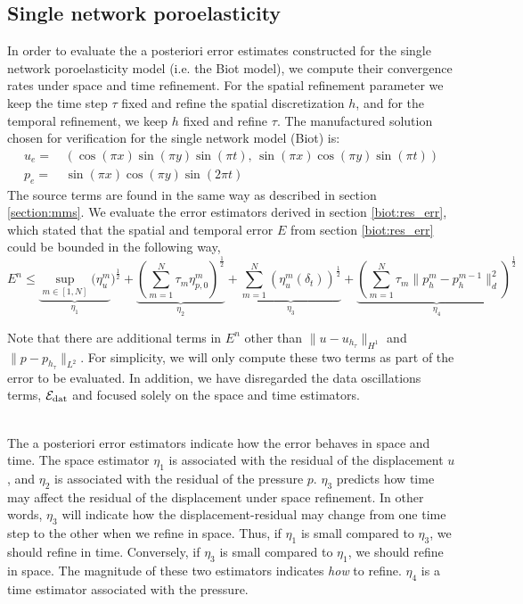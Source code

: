 \subsection{Single network poroelasticity} \label{section:num_exp_mpet1}
In order to evaluate the a posteriori error estimates constructed for the single network poroelasticity model (i.e. the Biot model), we compute their convergence rates under space and time refinement. For the spatial refinement parameter we keep the time step $\tau$ fixed and refine the spatial discretization $h$, and for the temporal refinement, we keep $h$ fixed and refine $\tau$. The manufactured solution chosen for verification for the single network model (Biot) is:
\begin{align*}
u_e = & \, \left(\cos(\pi x)\sin(\pi y)\sin(\pi t), \, \sin(\pi x)\cos(\pi y)\sin(\pi t)\right) \\
p_e = & \, \sin(\pi x) \cos(\pi y)\sin(2\pi t)
\end{align*}
The source terms are found in the same way as described in section \ref{section:mms}. We evaluate the error estimators derived in section \ref{biot:res_err}, which stated that the spatial and temporal error $E$ from section \ref{biot:res_err} could be bounded in the following way,
\begin{equation} \label{biot:error_upbd}
E^n \leq \underbrace{\sup_{m \in [1,N]} (\eta^m_u}_{\eta_1})^\frac{1}{2}  +  \underbrace{(\sum_{m=1}^N \tau_m \eta^m_{p,0})^\frac{1}{2}}_{\eta_2} + \underbrace{\sum_{m=1}^N (\eta^m_u(\delta_t))^\frac{1}{2}}_{\eta_3} + \underbrace{(\sum_{m=1}^N \tau_m \| p_h^m - p_h^{m-1}\|^2_d)^\frac{1}{2}}_{\eta_4}
\end{equation}
\begin{remark}
Note that there are additional terms in $E^n$ other than $\|u - u_{h_{\tau}}\|_{H^1}$ and $\|p - p_{h_{\tau}}\|_{L^2}$. For simplicity, we will only compute these two terms as part of the error to be evaluated. In addition, we have disregarded the data oscillations terms, $\mathcal{E}_{\textnormal{dat}}$ and focused solely on the space and time estimators.
\end{remark}
\mbox{}\\
The a posteriori error estimators indicate how the error behaves in space and time. The space estimator $\eta_1$ is associated with the residual of the displacement $u$, and $\eta_2$ is associated with the residual of the pressure $p$. $\eta_3$ predicts how time may affect the residual of the displacement under space refinement. In other words, $\eta_3$ will indicate how the displacement-residual may change from one time step to the other when we refine in space. Thus, if $\eta_1$ is small compared to $\eta_3$, we should refine in time. Conversely, if $\eta_3$ is small compared to $\eta_1$, we should refine in space. The magnitude of these two estimators indicates \textit{how} to refine. $\eta_4$ is a time estimator associated with the pressure. 

